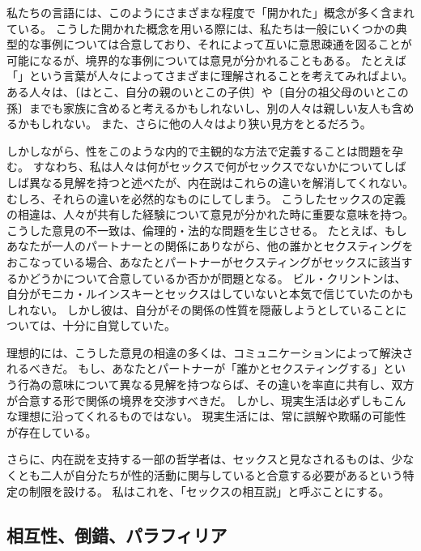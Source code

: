 \documentclass[paper=a4,book,openany]{jlreq}
\begin{document}
私たちの言語には、このようにさまざまな程度で「開かれた」概念が多く含まれている。
こうした開かれた概念を用いる際には、私たちは一般にいくつかの典型的な事例については合意しており、それによって互いに意思疎通を図ることが可能になるが、境界的な事例については意見が分かれることもある。
たとえば「」という言葉が人々によってさまざまに理解されることを考えてみればよい。
ある人々は、〔はとこ、自分の親のいとこの子供〕や〔自分の祖父母のいとこの孫〕までも家族に含めると考えるかもしれないし、別の人々は親しい友人も含めるかもしれない。
また、さらに他の人々はより狭い見方をとるだろう。

しかしながら、性をこのような内的で主観的な方法で定義することは問題を孕む。
すなわち、私は人々は何がセックスで何がセックスでないかについてしばしば異なる見解を持つと述べたが、内在説はこれらの違いを解消してくれない。
むしろ、それらの違いを必然的なものにしてしまう。
こうしたセックスの定義の相違は、人々が共有した経験について意見が分かれた時に重要な意味を持つ。
こうした意見の不一致は、倫理的・法的な問題を生じさせる。
たとえば、もしあなたが一人のパートナーとの関係にありながら、他の誰かとセクスティングをおこなっている場合、あなたとパートナーがセクスティングがセックスに該当するかどうかについて合意しているか否かが問題となる。
ビル・クリントンは、自分がモニカ・ルインスキーとセックスはしていないと本気で信じていたのかもしれない。
しかし彼は、自分がその関係の性質を隠蔽しようとしていることについては、十分に自覚していた。

理想的には、こうした意見の相違の多くは、コミュニケーションによって解決されるべきだ。
もし、あなたとパートナーが「誰かとセクスティングする」という行為の意味について異なる見解を持つならば、その違いを率直に共有し、双方が合意する形で関係の境界を交渉すべきだ。
しかし、現実生活は必ずしもこんな理想に沿ってくれるものではない。
現実生活には、常に誤解や欺瞞の可能性が存在している。

さらに、内在説を支持する一部の哲学者は、セックスと見なされるものは、少なくとも二人が自分たちが性的活動に関与していると合意する必要があるという特定の制限を設ける。
私はこれを、「セックスの相互説」と呼ぶことにする。

\subsection{相互性、倒錯、パラフィリア}
\end{document}
